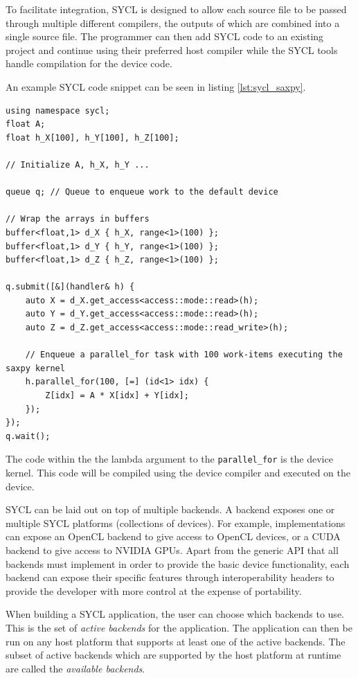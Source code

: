To facilitate integration, SYCL is designed to allow each source file to be passed through multiple different compilers, the outputs of which are combined into a single source file. The programmer can then add SYCL code to an existing project and continue using their preferred host compiler while the SYCL tools handle compilation for the device code.

An example SYCL code snippet can be seen in listing \ref{lst:sycl_saxpy}.

\begin{lstlisting}[style=CStyle, caption=SYCL saxpy example, float, floatplacement=H, label={lst:sycl_saxpy}]
using namespace sycl;
float A;
float h_X[100], h_Y[100], h_Z[100];

// Initialize A, h_X, h_Y ...

queue q; // Queue to enqueue work to the default device

// Wrap the arrays in buffers
buffer<float,1> d_X { h_X, range<1>(100) };
buffer<float,1> d_Y { h_Y, range<1>(100) };
buffer<float,1> d_Z { h_Z, range<1>(100) };

q.submit([&](handler& h) {
    auto X = d_X.get_access<access::mode::read>(h);
    auto Y = d_Y.get_access<access::mode::read>(h);
    auto Z = d_Z.get_access<access::mode::read_write>(h);

    // Enqueue a parallel_for task with 100 work-items executing the saxpy kernel
    h.parallel_for(100, [=] (id<1> idx) {
        Z[idx] = A * X[idx] + Y[idx];
    });
});
q.wait();
\end{lstlisting}

The code within the the lambda argument to the \texttt{parallel\_for} is the device kernel. This code will be compiled using the device compiler and executed on the device.

SYCL can be laid out on top of multiple backends. A backend exposes one or multiple SYCL platforms (collections of devices). For example, implementations can expose an OpenCL backend to give access to OpenCL devices, or a CUDA backend to give access to NVIDIA GPUs. Apart from the generic API that all backends must implement in order to provide the basic device functionality, each backend can expose their specific features through interoperability headers to provide the developer with more control at the expense of portability.

When building a SYCL application, the user can choose which backends to use. This is the set of \textit{active backends} for the application. The application can then be run on any host platform that supports at least one of the active backends. The subset of active backends which are supported by the host platform at runtime are called the \textit{available backends}.

